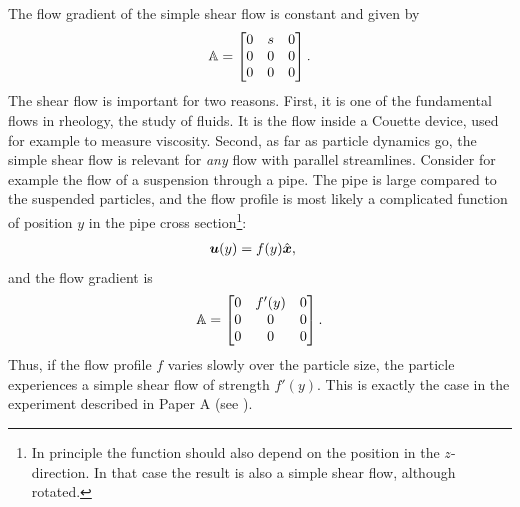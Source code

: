 \documentclass[thesis.tex]{subfiles}
\begin{document}
The flow gradient of the simple shear flow is constant and given by
\begin{align*}
	\mathbb{A} = \begin{bmatrix}
		0 & s & 0 \\
		0 & 0 & 0 \\
		0 & 0 & 0 
	\end{bmatrix}.
\end{align*}
The shear flow is important for two reasons. First, it is one of the fundamental flows in rheology, the study of fluids. It is the flow inside a Couette device, used for example to measure viscosity. Second, as far as particle dynamics go, the simple shear flow is relevant for \emph{any} flow with parallel streamlines. Consider for example the flow of a suspension through a pipe. The pipe is large compared to the suspended particles, and the flow profile is most likely a complicated function of position $y$ in the pipe cross section\footnote{In principle the function should also depend on the position in the $z$-direction. In that case the result is also a simple shear flow, although rotated.}:
\begin{align*}
	\mbox{\boldmath$u$}(y) &= f(y)\hat{\mbox{\boldmath$x$}},
\end{align*}
 and the flow gradient is
\begin{align*}
	\mathbb{A} = \begin{bmatrix}
		0 & f'(y) & 0 \\
		0 & 0 & 0 \\
		0 & 0 & 0 
	\end{bmatrix}.
\end{align*}
Thus, if the flow profile $f$ varies slowly over the particle size, the particle experiences a simple shear flow of strength $f'(y)$. This is exactly the case in the experiment described in Paper A (see ).
\end{document}
